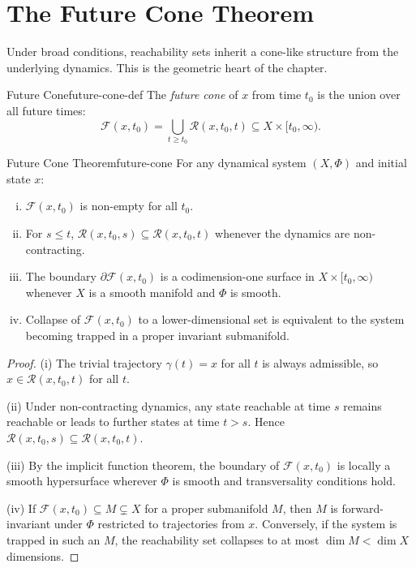 \documentclass[12pt,twoside,openright]{book}
\newcommand{\reach}{\mathcal{R}}
\begin{document}
\section{The Future Cone Theorem}
\label{sec:ch13-future-cone}

Under broad conditions, reachability sets inherit a
cone-like structure from the underlying dynamics. This is
the geometric heart of the chapter.

\begin{definition}{Future Cone}{future-cone-def}
  The \emph{future cone} of $x$ from time $t_0$ is the union
  over all future times:
  \[
    \mathcal{F}(x,t_0) = \bigcup_{t\ge t_0} \reach(x,t_0,t)
    \subseteq X \times [t_0,\infty).
  \]
\end{definition}

\begin{theorem}{Future Cone Theorem}{future-cone}
  For any dynamical system $(X,\Phi)$ and initial state $x$:
  \begin{enumerate}[(i)]
    \item $\mathcal{F}(x,t_0)$ is non-empty for all $t_0$.
    \item For $s\le t$, $\reach(x,t_0,s) \subseteq
          \reach(x,t_0,t)$ whenever the dynamics are
          non-contracting.
    \item The boundary $\partial\mathcal{F}(x,t_0)$ is a
          codimension-one surface in
          $X\times[t_0,\infty)$ whenever $X$ is a smooth
          manifold and $\Phi$ is smooth.
    \item Collapse of $\mathcal{F}(x,t_0)$ to a
          lower-dimensional set is equivalent to the system
          becoming trapped in a proper invariant
          submanifold.
  \end{enumerate}
\end{theorem}

\begin{proof}
  (i) The trivial trajectory $\gamma(t)=x$ for all $t$ is
  always admissible, so $x\in\reach(x,t_0,t)$ for all $t$.

  (ii) Under non-contracting dynamics, any state reachable
  at time $s$ remains reachable or leads to further states
  at time $t>s$. Hence
  $\reach(x,t_0,s)\subseteq\reach(x,t_0,t)$.

  (iii) By the implicit function theorem, the boundary of
  $\mathcal{F}(x,t_0)$ is locally a smooth hypersurface
  wherever $\Phi$ is smooth and transversality conditions
  hold.

  (iv) If $\mathcal{F}(x,t_0)\subseteq M \subsetneq X$ for a
  proper submanifold $M$, then $M$ is forward-invariant
  under $\Phi$ restricted to trajectories from $x$.
  Conversely, if the system is trapped in such an $M$, the
  reachability set collapses to at most $\dim M < \dim X$
  dimensions.
\end{proof}
\end{document}
